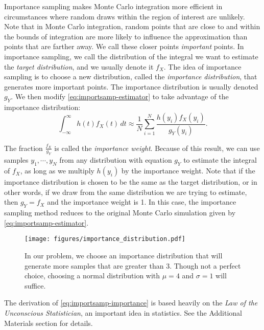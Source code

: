 Importance sampling makes Monte Carlo integration more efficient in circumstances where random draws within the region of interest are unlikely.
Note that in Monte Carlo integration, random points that are close to and within the bounds of integration are more likely to influence the approximation than points that are farther away.
We call these closer points \emph{important} points.
In importance sampling, we call the distribution of the integral we want to estimate the \emph{target distribution}, and we usually denote it $f_X$.
The idea of importance sampling is to choose a new distribution, called the \emph{importance distribution}, that generates more important points.
The importance distribution is usually denoted $g_Y$.
We then modify \eqref{eq:importsamp-estimator} to take advantage of the importance distribution:
\begin{equation} \label{eq:importsamp-importance}
\int_{-\infty}^{\infty} h(t)f_X(t)\,dt \approx \frac{1}{N}\sum_{i = 1}^{N}\frac{h(y_i)f_X(y_i)}{g_Y(y_i)}.
\end{equation}

The fraction $\frac{f_X}{g_Y}$ is called the \emph{importance weight}.
Because of this result, we can use samples $y_1, \cdots , y_N$ from any distribution with equation $g_Y$ to estimate the integral of $f_X$, as long as we multiply $h(y_i)$ by the importance weight.
Note that if the importance distribution is chosen to be the same as the target distribution, or in other words, if we draw from the same distribution we are trying to estimate, then $g_Y = f_X$ and the importance weight is 1.
In this case, the importance sampling method reduces to the original Monte Carlo simulation given by \eqref{eq:importsamp-estimator}.

\begin{figure}[H]
\texttt{[image: figures/importance\_distribution.pdf]}
\caption{In our problem, we choose an importance distribution that will generate more samples that are greater than 3. Though not a perfect choice, choosing a normal distribution with $\mu = 4$ and $\sigma = 1$ will suffice.}
\label{fig:importance}
\end{figure}

\begin{info}
The derivation of \eqref{eq:importsamp-importance} is based heavily on the \emph{Law of the Unconscious Statistician}, an important idea in statistics.
See the Additional Materials section for details.
\end{info}

